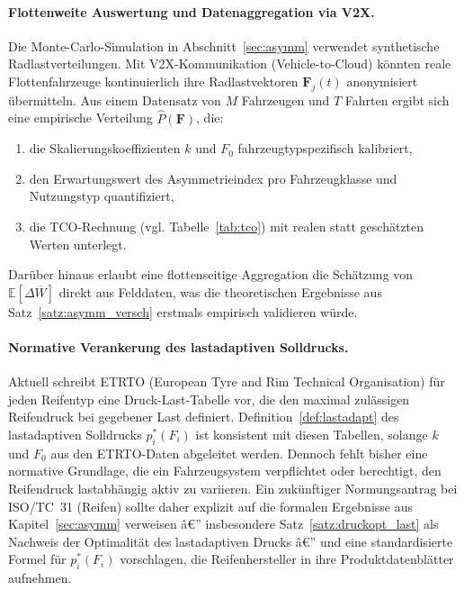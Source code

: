 ﻿\documentclass[a4paper,12pt]{article}
\theoremstyle{definition}
\begin{document}
\paragraph{Flottenweite Auswertung und Datenaggregation via V2X.}
Die Monte-Carlo-Simulation in Abschnitt~\ref{sec:asymm} verwendet
synthetische Radlastverteilungen. Mit V2X-Kommu\-nikation (Vehicle-to-Cloud)
könnten reale Flottenfahrzeuge kontinuierlich ihre Radlastvektoren
$\mathbf{F}_j(t)$ anonymisiert übermitteln. Aus einem
Datensatz von $M$ Fahrzeugen und $T$ Fahrten ergibt sich eine
empirische Verteilung $\hat{P}(\mathbf{F})$, die:
\begin{enumerate}
    \item die Skalierungskoeffizienten $k$ und $F_0$ fahrzeugtypspezifisch
    kalibriert,
    \item den Erwartungswert des Asymmetrieindex pro Fahrzeugklasse und
    Nutzungstyp quantifiziert,
    \item die TCO-Rechnung (vgl. Tabelle~\ref{tab:tco}) mit realen
    statt geschätzten Werten unterlegt.
\end{enumerate}
Darüber hinaus erlaubt eine flottenseitige Aggregation die Schätzung von
$\mathbb{E}[\Delta \overline{W}]$ direkt aus Felddaten, was die theoretischen
Ergebnisse aus Satz~\ref{satz:asymm_versch} erstmals empirisch validieren würde.

\paragraph{Normative Verankerung des lastadaptiven Solldrucks.}
Aktuell schreibt ETRTO (European Tyre and Rim Technical Organisation)
für jeden Reifentyp eine Druck-Last-Tabelle vor, die den maximal
zulässigen Reifendruck bei gegebener Last definiert. Definition~\ref{def:lastadapt}
des lastadaptiven Solldrucks $p^*_i(F_i)$ ist konsistent mit diesen
Tabellen, solange $k$ und $F_0$ aus den ETRTO-Daten abgeleitet werden.
Dennoch fehlt bisher eine normative Grundlage, die ein Fahrzeugsystem
verpflichtet oder berechtigt, den Reifendruck lastabhängig aktiv zu variieren.
Ein zukünftiger Normungsantrag bei ISO/TC~31 (Reifen) sollte daher
explizit auf die formalen Ergebnisse aus Kapitel~\ref{sec:asymm} verweisen â€”
insbesondere Satz~\ref{satz:druckopt_last} als Nachweis der Optimalität
des lastadaptiven Drucks â€” und eine standardisierte Formel für $p^*_i(F_i)$
vorschlagen, die Reifenhersteller in ihre Produktdatenblätter aufnehmen.
\end{document}
